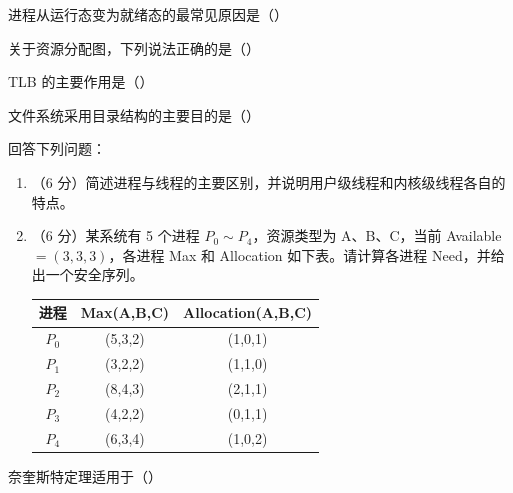 \documentclass[a4paper,11pt]{article}
\begin{document}

\q 进程从运行态变为就绪态的最常见原因是（\quad）

\q 关于资源分配图，下列说法正确的是（\quad）

\q TLB 的主要作用是（\quad）

\q 文件系统采用目录结构的主要目的是（\quad）


\q 回答下列问题：
\begin{enumerate}[label=（\arabic*）, leftmargin=2.4em, itemsep=2pt]
  \item （6 分）简述进程与线程的主要区别，并说明用户级线程和内核级线程各自的特点。
  \item （6 分）某系统有 5 个进程 $P_0\sim P_4$，资源类型为 A、B、C，当前 Available $=(3,3,3)$，各进程 Max 和 Allocation 如下表。请计算各进程 Need，并给出一个安全序列。
  \begin{center}\small
  \begin{tabular}{ccc}
  \toprule
  进程 & Max(A,B,C) & Allocation(A,B,C) \\
  \midrule
  $P_0$ & (5,3,2) & (1,0,1) \\
  $P_1$ & (3,2,2) & (1,1,0) \\
  $P_2$ & (8,4,3) & (2,1,1) \\
  $P_3$ & (4,2,2) & (0,1,1) \\
  $P_4$ & (6,3,4) & (1,0,2) \\
  \bottomrule
  \end{tabular}
  \end{center}
\end{enumerate}
\anslines{9cm}



\q 奈奎斯特定理适用于（\quad）
\end{document}
